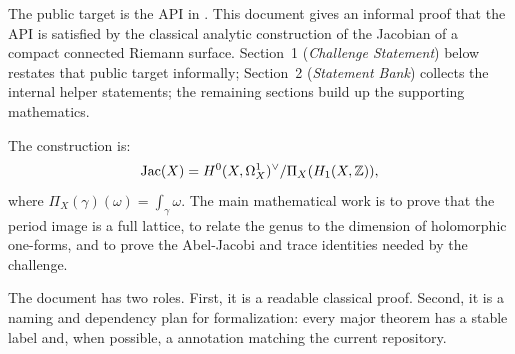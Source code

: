 The public target is the API in . This
document gives an informal proof that the API is satisfied by the classical
analytic construction of the Jacobian of a compact connected Riemann surface.
Section~1 (\emph{Challenge Statement}) below restates that public target
informally; Section~2 (\emph{Statement Bank}) collects the internal
helper statements; the remaining sections build up the supporting
mathematics.

The construction is:
\[
  \operatorname{Jac}(X)=H^{0}(X,\Omega^{1}_{X})^{\vee}/\Pi_X(H_{1}(X,\mathbb{Z})),
\]
where \(\Pi_X(\gamma)(\omega)=\int_{\gamma}\omega\). The main mathematical
work is to prove that the period image is a full lattice, to relate the genus
to the dimension of holomorphic one-forms, and to prove the Abel-Jacobi and
trace identities needed by the challenge.

The document has two roles. First, it is a readable classical proof. Second, it
is a naming and dependency plan for formalization: every major theorem has a
stable label and, when possible, a  annotation matching the
current repository.
